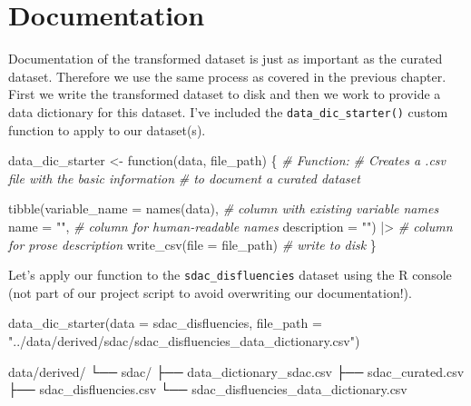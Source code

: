 \documentclass[
  letterpaper,
]{scrbook}
\newenvironment{Shaded}{\begin{snugshade}}{\end{snugshade}}
\newcommand{\AttributeTok}[1]{\textcolor[rgb]{0.00,0.00,0.00}{#1}}
\newcommand{\CommentTok}[1]{\textcolor[rgb]{0.00,0.00,0.00}{\textit{#1}}}
\newcommand{\ControlFlowTok}[1]{\textcolor[rgb]{0.00,0.00,0.00}{#1}}
\newcommand{\ExtensionTok}[1]{\textcolor[rgb]{0.00,0.00,0.00}{#1}}
\newcommand{\FunctionTok}[1]{\textcolor[rgb]{0.00,0.00,0.00}{#1}}
\newcommand{\NormalTok}[1]{\textcolor[rgb]{0.00,0.00,0.00}{#1}}
\newcommand{\OtherTok}[1]{\textcolor[rgb]{0.00,0.00,0.00}{#1}}
\newcommand{\SpecialCharTok}[1]{\textcolor[rgb]{0.00,0.00,0.00}{#1}}
\newcommand{\StringTok}[1]{\textcolor[rgb]{0.00,0.00,0.00}{#1}}
\begin{document}
\hypertarget{documentation-3}{%
\section{Documentation}\label{documentation-3}}

Documentation of the transformed dataset is just as important as the
curated dataset. Therefore we use the same process as covered in the
previous chapter. First we write the transformed dataset to disk and
then we work to provide a data dictionary for this dataset. I've
included the \texttt{data\_dic\_starter()} custom function to apply to
our dataset(s).

\begin{Shaded}
\begin{Highlighting}[]
\NormalTok{data\_dic\_starter }\OtherTok{\textless{}{-}} \ControlFlowTok{function}\NormalTok{(data, file\_path) \{}
  \CommentTok{\# Function:}
  \CommentTok{\# Creates a .csv file with the basic information}
  \CommentTok{\# to document a curated dataset}
  
  \FunctionTok{tibble}\NormalTok{(}\AttributeTok{variable\_name =} \FunctionTok{names}\NormalTok{(data), }\CommentTok{\# column with existing variable names }
       \AttributeTok{name =} \StringTok{""}\NormalTok{, }\CommentTok{\# column for human{-}readable names}
       \AttributeTok{description =} \StringTok{""}\NormalTok{) }\SpecialCharTok{|\textgreater{}} \CommentTok{\# column for prose description}
  \FunctionTok{write\_csv}\NormalTok{(}\AttributeTok{file =}\NormalTok{ file\_path) }\CommentTok{\# write to disk}
\NormalTok{\}}
\end{Highlighting}
\end{Shaded}

Let's apply our function to the \texttt{sdac\_disfluencies} dataset
using the R console (not part of our project script to avoid overwriting
our documentation!).

\begin{Shaded}
\begin{Highlighting}[]
\FunctionTok{data\_dic\_starter}\NormalTok{(}\AttributeTok{data =}\NormalTok{ sdac\_disfluencies, }\AttributeTok{file\_path =} \StringTok{"../data/derived/sdac/sdac\_disfluencies\_data\_dictionary.csv"}\NormalTok{)}
\end{Highlighting}
\end{Shaded}

\begin{Shaded}
\begin{Highlighting}[]
\ExtensionTok{data/derived/}
\ExtensionTok{└──}\NormalTok{ sdac/}
    \ExtensionTok{├──}\NormalTok{ data\_dictionary\_sdac.csv}
    \ExtensionTok{├──}\NormalTok{ sdac\_curated.csv}
    \ExtensionTok{├──}\NormalTok{ sdac\_disfluencies.csv}
    \ExtensionTok{└──}\NormalTok{ sdac\_disfluencies\_data\_dictionary.csv}
\end{Highlighting}
\end{Shaded}
\end{document}
